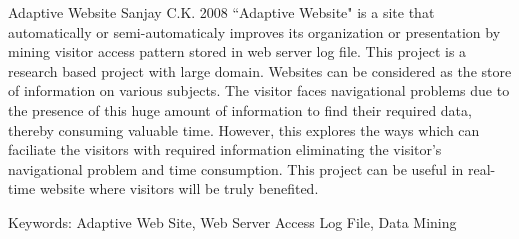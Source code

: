 \begin{conf-abstract}[]
{Adaptive Website}
{
 Sanjay C.K.
}
{2008}
``Adaptive Website" is a site that automatically or semi-automaticaly improves its organization or presentation by mining visitor access pattern stored in web server log file. This project is a research based project with large domain. Websites can be considered as the store of information on various subjects. The visitor faces navigational problems due to the presence of this huge amount of information to find their required data, thereby consuming valuable time. However, this explores the ways which can faciliate the visitors with required information eliminating the visitor's navigational problem and time consumption. This project can be useful in real-time website where visitors will be truly benefited.

Keywords: Adaptive Web Site, Web Server Access Log File, Data Mining
\end{conf-abstract}